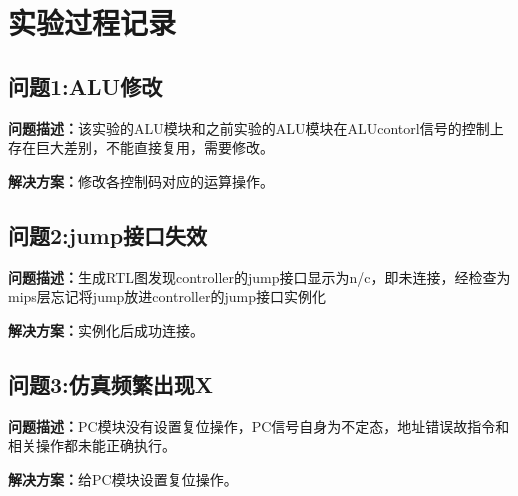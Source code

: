 \section{实验过程记录}
\subsection{问题1:ALU修改}
\textbf{问题描述：}该实验的ALU模块和之前实验的ALU模块在ALUcontorl信号的控制上存在巨大差别，不能直接复用，需要修改。

\textbf{解决方案：}修改各控制码对应的运算操作。
\subsection{问题2:jump接口失效}
\textbf{问题描述：}生成RTL图发现controller的jump接口显示为n/c，即未连接，经检查为mips层忘记将jump放进controller的jump接口实例化

\textbf{解决方案：}实例化后成功连接。
\subsection{问题3:仿真频繁出现X}
\textbf{问题描述：}PC模块没有设置复位操作，PC信号自身为不定态，地址错误故指令和相关操作都未能正确执行。

\textbf{解决方案：}给PC模块设置复位操作。